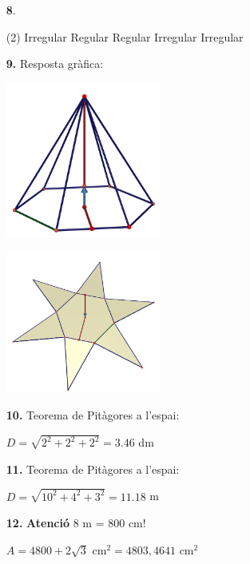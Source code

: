 \documentclass[a4paper, pdf, twoside]{book}
\begin{document}
\begin{multicols}{2}
\begin{enumerate}

 \item[\fontfamily{phv}\selectfont\color{blue}\textbf{8}. ] 
 \begin{tasks}[column-sep=1em, item-indent=1.3333em](2)
	 \task Irregular
	 \task Regular
	 \task Regular
	 \task Irregular
	 \task Irregular
\end{tasks}
\vspace{0.25cm}
\item[\fontfamily{phv}\selectfont\color{blue}\textbf{9. }] 
Resposta gràfica:\par \includegraphics [width=0.4\textwidth ]{img-sol/t11-14a}\par \includegraphics [width=0.4\textwidth ]{img-sol/t11-14b}
\vspace{0.25cm}
\item[\fontfamily{phv}\selectfont\color{blue}\textbf{10. }]  \scalebox{0.6}{\simbolclau } 
Teorema de Pitàgores a l'espai:\par $D=\sqrt {2^2+2^2+2^2}=3.46$ dm
\vspace{0.25cm}
\item[\fontfamily{phv}\selectfont\color{blue}\textbf{11. }]  \scalebox{0.6}{\simbolclau } 
Teorema de Pitàgores a l'espai:\par $D=\sqrt {10^2+4^2+3^2}=11.18$ m
\vspace{0.25cm}
\item[\fontfamily{phv}\selectfont\color{blue}\textbf{12. }] 
\textbf {Atenció} 8 m = 800 cm!\par $A=4800 + 2 \sqrt {3}$ cm$^2 = 4803,4641$ cm$^2$

\end{enumerate}
\end{multicols}
\end{document}
